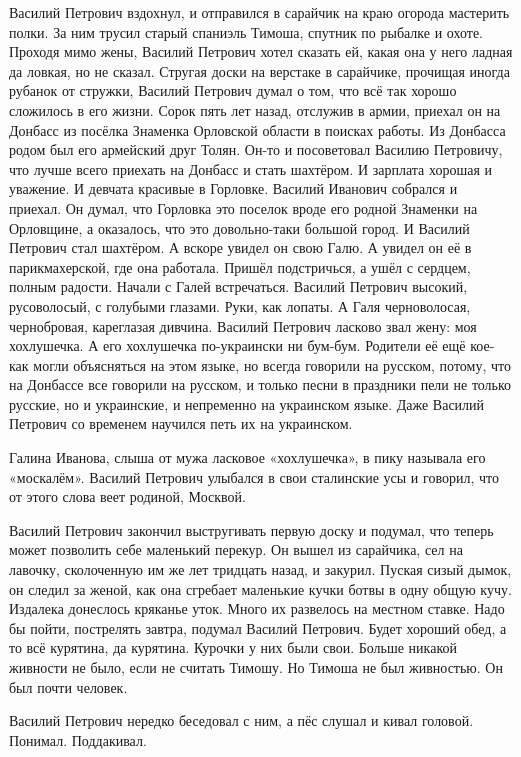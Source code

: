 Василий Петрович вздохнул, и отправился в сарайчик на краю огорода мастерить
полки. За ним трусил старый спаниэль Тимоша, спутник по рыбалке и охоте.
Проходя мимо жены, Василий Петрович хотел сказать ей, какая она у него ладная
да ловкая, но не сказал. Стругая доски на верстаке в сарайчике, прочищая иногда
рубанок от стружки, Василий Петрович думал о том, что всё так хорошо сложилось
в его жизни. Сорок пять лет назад, отслужив в армии, приехал он на Донбасс из
посёлка Знаменка Орловской области в поисках работы. Из Донбасса родом был его
армейский друг Толян. Он-то и посоветовал Василию Петровичу, что лучше всего
приехать на Донбасс и стать шахтёром. И зарплата хорошая и уважение. И девчата
красивые в Горловке. Василий Иванович собрался и приехал. Он думал, что
Горловка это поселок вроде его родной Знаменки на Орловщине, а оказалось, что
это довольно-таки большой город. И Василий Петрович стал шахтёром. А вскоре
увидел он свою Галю. А увидел он её в парикмахерской, где она работала. Пришёл
подстричься, а ушёл с сердцем, полным радости. Начали с Галей встречаться.
Василий Петрович высокий, русоволосый, с голубыми глазами. Руки, как лопаты. А
Галя черноволосая, чернобровая, кареглазая дивчина. Василий Петрович ласково
звал жену: моя хохлушечка. А его хохлушечка по-украински ни бум-бум. Родители
её ещё кое-как могли объясняться на этом языке, но всегда говорили на русском,
потому, что на Донбассе все говорили на русском, и только песни в праздники
пели не только русские, но и украинские, и непременно на украинском языке. Даже
Василий Петрович со временем научился петь их на украинском.

Галина Иванова, слыша от мужа ласковое «хохлушечка», в пику называла его «москалём». Василий Петрович улыбался в свои сталинские усы и говорил, что от этого слова веет родиной, Москвой.

Василий Петрович закончил выстругивать первую доску и подумал, что теперь может
позволить себе маленький перекур. Он вышел из сарайчика, сел на лавочку,
сколоченную им же лет тридцать назад, и закурил. Пуская сизый дымок, он следил
за женой, как она сгребает маленькие кучки ботвы в одну общую кучу. Издалека
донеслось кряканье уток. Много их развелось на местном ставке. Надо бы пойти,
пострелять завтра, подумал Василий Петрович. Будет хороший обед, а то всё
курятина, да курятина. Курочки у них были свои. Больше никакой живности не
было, если не считать Тимошу. Но Тимоша не был живностью. Он был почти человек.

Василий Петрович нередко беседовал с ним, а пёс слушал и кивал головой.
Понимал. Поддакивал.


